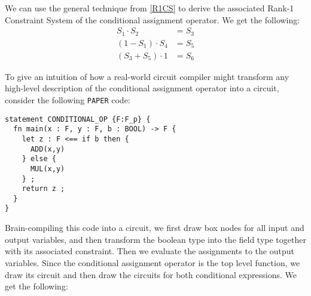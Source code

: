 We can use the general technique from \ref{R1CS} to derive the associated Rank-1 Constraint System of the conditional assignment operator. We get the following:
\begin{align*}
S_1 \cdot S_2 & = S_3 \\
(1 - S_1) \cdot S_4 & = S_5 \\
(S_3 + S_5)\cdot 1 &= S_6
\end{align*}
\begin{example} To give an intuition of how a real-world circuit compiler might transform any high-level description of the conditional assignment operator into a circuit, consider the following \texttt{PAPER} code:
\begin{lstlisting}
statement CONDITIONAL_OP {F:F_p} {
  fn main(x : F, y : F, b : BOOL) -> F {
    let z : F <== if b then { 
      ADD(x,y) 
    } else { 
      MUL(x,y) 
    } ;
    return z ; 
  }
}
\end{lstlisting}
Brain-compiling this code into a circuit, we first draw box nodes for all input and output variables, and then transform the boolean type into the field type together with its associated constraint. Then we evaluate the assignments to the output variables. Since the conditional assignment operator is the top level function, we draw its circuit and then draw the circuits for both conditional expressions. We get the following:
\begin{center}
\end{center}
\end{example}
